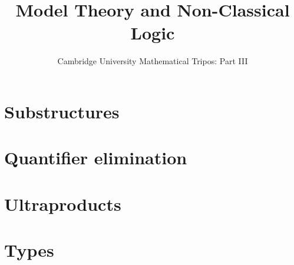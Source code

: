 \documentclass{article}
\title{Model Theory and Non-Classical Logic}
\author{Cambridge University Mathematical Tripos: Part III}
\begin{document}
\maketitle

\tableofcontentsnewpage{}

\section{Substructures}

\section{Quantifier elimination}

\section{Ultraproducts}

\section{Types}

\end{document}
